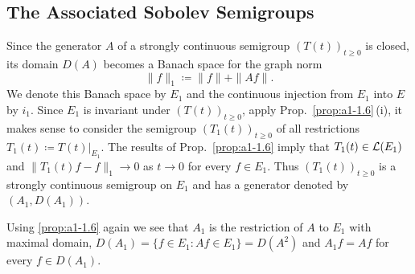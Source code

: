 \subsection{The Associated Sobolev Semigroups}\label{subsec:a1-3.5}
Since the generator $A$ of a strongly continuous semigroup $(T(t))_{t\geq 0}$ is closed, its domain $D(A)$ becomes a Banach space for the graph norm
\[
    \|f\|_{1} \coloneqq \|f\| + \|Af\| .
\]
We denote this Banach space by $E_{1}$ and the continuous injection from $E_{1}$ into $E$ by $i_{1}$.
Since $E_{1}$ is invariant under $(T(t))_{t\geq 0}$, apply Prop.~\ref{prop:a1-1.6}\,(i), it makes sense to consider the semigroup $(T_{1}(t))_{t\geq 0}$ of all restrictions $T_{1}(t) \coloneqq T(t)|_{E_{1}}$.
The results of Prop.~\ref{prop:a1-1.6} imply that $T_{1}(t) \in \mathcal{L}(E_{1})$ and $\|T_{1}(t)f-f\|_{1} \to 0$ as $t \to 0$ for every $f \in E_{1}$.
Thus $(T_{1}(t))_{t\geq 0}$ is a strongly continuous semigroup on $E_{1}$ and has a generator denoted by $(A_{1},D(A_{1}))$.

Using \ref{prop:a1-1.6} again we see that $A_{1}$ is the restriction of $A$ to $E_{1}$ with maximal domain, \ie
$D(A_{1}) = \{f \in E_{1} \colon Af \in E_{1}\} = D(A^{2})$ and
$A_{1}f = Af$ for every $f \in D(A_{1})$.

